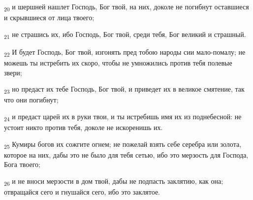 \begin{tcolorbox}
\textsubscript{20} и шершней нашлет Господь, Бог твой, на них, доколе не погибнут оставшиеся и скрывшиеся от лица твоего;
\end{tcolorbox}
\begin{tcolorbox}
\textsubscript{21} не страшись их, ибо Господь, Бог твой, среди тебя, Бог великий и страшный.
\end{tcolorbox}
\begin{tcolorbox}
\textsubscript{22} И будет Господь, Бог твой, изгонять пред тобою народы сии мало-помалу; не можешь ты истребить их скоро, чтобы не умножились против тебя полевые звери;
\end{tcolorbox}
\begin{tcolorbox}
\textsubscript{23} но предаст их тебе Господь, Бог твой, и приведет их в великое смятение, так что они погибнут;
\end{tcolorbox}
\begin{tcolorbox}
\textsubscript{24} и предаст царей их в руки твои, и ты истребишь имя их из поднебесной: не устоит никто против тебя, доколе не искоренишь их.
\end{tcolorbox}
\begin{tcolorbox}
\textsubscript{25} Кумиры богов их сожгите огнем; не пожелай взять себе серебра или золота, которое на них, дабы это не было для тебя сетью, ибо это мерзость для Господа, Бога твоего;
\end{tcolorbox}
\begin{tcolorbox}
\textsubscript{26} и не вноси мерзости в дом твой, дабы не подпасть заклятию, как она; отвращайся сего и гнушайся сего, ибо это заклятое.
\end{tcolorbox}
